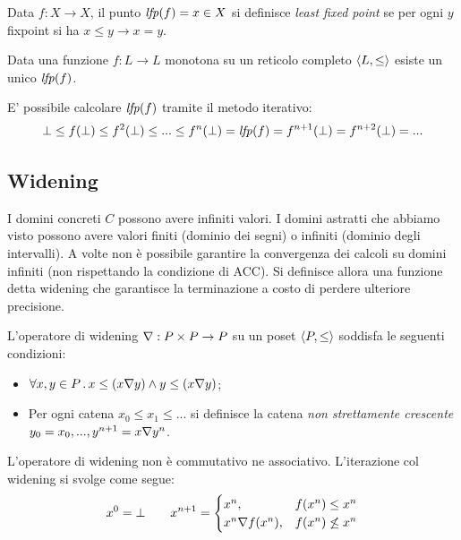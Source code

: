 \begin{definition}
Data $f:X \to X$, il punto $\mathit{lfp}(f) = x \in X$ si definisce \emph{least fixed point} se per ogni $y$ fixpoint si ha $x \le y \to x = y$.
\end{definition}

\begin{theorem}
Data una funzione $f:L \to L$ monotona su un reticolo completo $\langle L, \le \rangle$ esiste un unico $\mathit{lfp}(f)$.
\end{theorem}

E' possibile calcolare $\mathit{lfp}(f)$ tramite il metodo iterativo:
$$\bot \le f(\bot) \le f^2(\bot) \le ... \le f^n(\bot) = \mathit{lfp}(f) = f^{n+1}(\bot) = f^{n+2}(\bot) = ...$$

\subsection{Widening}

I domini concreti $C$ possono avere infiniti valori. I domini astratti che abbiamo visto possono avere valori finiti (dominio dei segni) o infiniti (dominio degli intervalli). A volte non è possibile garantire la convergenza dei calcoli su domini infiniti (non rispettando la condizione di ACC). Si definisce allora una funzione detta widening che garantisce la terminazione a costo di perdere ulteriore precisione.

\begin{definition}
L'operatore di widening $\wide: P \times P \to P$ su un poset $\langle P, \le \rangle$ soddisfa le seguenti condizioni:
\begin{itemize}
    \item $\forall x,y \in P \, . \, x \le (\wide[x][y]) \land y \le (\wide[x][y])$;
    \item Per ogni catena $x_0 \le x_1 \le ...$ si definisce la catena \emph{non strettamente crescente} $y_0 = x_0, ..., y^{n+1} = \wide[x][y^n]$.
\end{itemize}
\end{definition}

L'operatore di widening non è commutativo ne associativo. L'iterazione col widening si svolge come segue:
$$x^0 = \bot \qquad x^{n+1} = \begin{cases} 
    x^n,                & f(x^n) \le x^n \\ 
    \wide[x^n][f(x^n)], & f(x^n) \not\le x^n \\
\end{cases}$$
